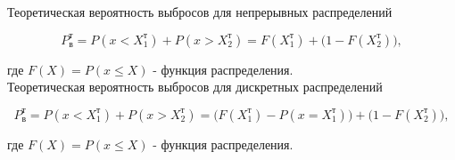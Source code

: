 Теоретическая вероятность выбросов для непрерывных распределений

\begin{equation} \label{eq:probTheorCont}
	P_\text{в}^\text{т} = P(x < X_1^\text{т}) + P(x > X_2^\text{т}) = F(X_1^\text{т}) + \Big(1 - F(X_2^\text{т})\Big),
\end{equation}

где $F(X) = P(x \le X)$ - функция распределения.\\

Теоретическая вероятность выбросов для дискретных распределений

\begin{equation} \label{eq:probTheorDisc}
	P_\text{в}^\text{т} = P(x < X_1^\text{т}) + P(x > X_2^\text{т}) = \Big(F(X_1^\text{т}) - P(x = X_1^\text{т})\Big) + \Big(1 - F(X_2^\text{т})\Big),
\end{equation}

где $F(X) = P(x \le X)$ - функция распределения.


